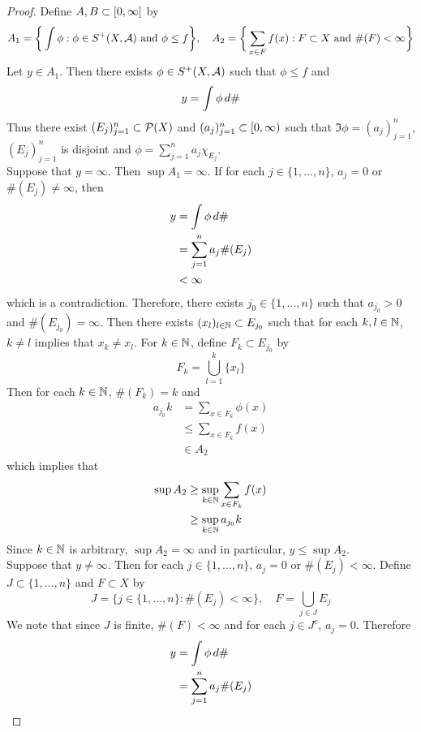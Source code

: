 \documentclass{book}
\begin{document}
	\begin{proof}
		Define $A,B \subset [0,\infty]$ by 
		$$A_1 = \bigg \{\int \phi: \phi \in S^+(X, \mathcal{A}) \text{ and } \phi \leq f \bigg \}, \quad A_2 = \bigg \{\sum_{x \in F}f(x): F \subset X \text{ and } \#(F) < \infty \bigg \}$$ 
		Let $y \in A_1$. Then there exists $\phi \in S^+(X, \mathcal{A})$ such that $\phi \leq f$ and 
		$$y = \int \phi \, d \#$$  
		Thus there exist $(E_j)_{j=1}^n \subset \mathcal{P}(X)$ and $(a_j)_{j =1}^n \subset [0,\infty)$ such that $\Im \phi = (a_j)_{j =1}^n$, $(E_j)_{j=1}^n$ is disjoint and $\phi = \sum\limits_{j=1}^n a_j \chi_{E_j}$. \\
		Suppose that $y = \infty$. Then $\sup A_1 = \infty$. If for each $j \in \{1, \ldots, n\}$, $a_j = 0$ or $\#(E_j) \neq \infty$, then 
		\begin{align*}
			y
			& = \int \phi \, d \# \\
			& = \sum_{j=1}^n a_j \#(E_j) \\
			& < \infty 
		\end{align*}
		which is a contradiction. Therefore, there exists $j_0 \in \{1, \ldots, n\}$ such that $a_{j_0} >0$ and $\#(E_{j_0}) = \infty$. Then there exists $(x_l)_{l \in \mathbb{N}} \subset E_{j_0}$ such that for each $k, l \in \mathbb{N}$, $k \neq l$ implies that $x_k \neq x_l$. For $k \in \mathbb{N}$, define $F_k \subset E_{j_0}$ by 
		$$F_k = \bigcup_{l=1}^k \{x_l\}$$
		Then for each $k \in \mathbb{N}$, $\#(F_k) = k$ and 
		\begin{align*}
			a_{j_0} k
			& = \sum_{x \in F_k} \phi(x) \\
			& \leq \sum_{x \in F_k}f(x) \\
			& \in A_2
		\end{align*}
		which implies that
		\begin{align*}
			\sup A_2
			& \geq \sup_{k \in \mathbb{N}}  \sum_{x \in F_k}f(x) \\
			& \geq \sup_{k \in \mathbb{N}} a_{j_0} k
		\end{align*}
		Since $k \in \mathbb{N}$ is arbitrary, $\sup A_2 = \infty$ and in particular, $y \leq \sup A_2$.\\
		Suppose that $y \neq \infty$. Then for each $j \in \{1, \ldots, n\}$, $a_j = 0$ or $\#(E_j) < \infty$. Define $J \subset \{1, \ldots, n\}$ and $F \subset X$ by 
		$$J = \{j \in \{1, \ldots, n\}: \#(E_j) < \infty \}, \quad F = \bigcup_{j \in J}E_j$$
		We note that since $J$ is finite, $\#(F) < \infty$ and for each $j \in J^c$, $a_j = 0$. Therefore
		\begin{align*}
			y
			& = \int \phi \dsh \\
			& = \sum_{j =1}^n a_j \#(E_j) \\

\end{align*}
\end{proof}
\end{document}
